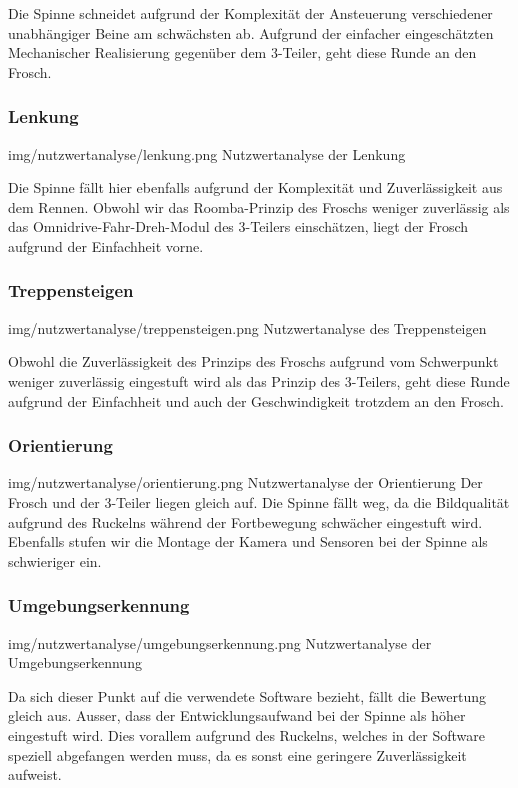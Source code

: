 Die Spinne schneidet aufgrund der Komplexität der Ansteuerung verschiedener unabhängiger Beine am schwächsten ab. Aufgrund der einfacher eingeschätzten Mechanischer Realisierung gegenüber dem 3-Teiler, geht diese Runde an den Frosch.
   
\subsubsection{Lenkung}
\image
   {img/nutzwertanalyse/lenkung.png}
   {Nutzwertanalyse der Lenkung}
   
Die Spinne fällt hier ebenfalls aufgrund der Komplexität und Zuverlässigkeit aus dem Rennen. Obwohl wir das Roomba-Prinzip des Froschs weniger zuverlässig als das Omnidrive-Fahr-Dreh-Modul des 3-Teilers einschätzen, liegt der Frosch aufgrund der Einfachheit vorne.
   
\subsubsection{Treppensteigen}
\image
   {img/nutzwertanalyse/treppensteigen.png}
   {Nutzwertanalyse des Treppensteigen}
   
Obwohl die Zuverlässigkeit des Prinzips des Froschs aufgrund vom Schwerpunkt weniger zuverlässig eingestuft wird als das Prinzip des 3-Teilers, geht diese Runde aufgrund der Einfachheit und auch der Geschwindigkeit trotzdem an den Frosch.
   
\subsubsection{Orientierung}
\image
   {img/nutzwertanalyse/orientierung.png}
   {Nutzwertanalyse der Orientierung}
   Der Frosch und der 3-Teiler liegen gleich auf. Die Spinne fällt weg, da die Bildqualität aufgrund des Ruckelns während der Fortbewegung schwächer eingestuft wird. Ebenfalls stufen wir die Montage der Kamera und Sensoren bei der Spinne als schwieriger ein.

\subsubsection{Umgebungserkennung}
\image
   {img/nutzwertanalyse/umgebungserkennung.png}
   {Nutzwertanalyse der Umgebungserkennung}
   
Da sich dieser Punkt auf die verwendete Software bezieht, fällt die Bewertung gleich aus. Ausser, dass der Entwicklungsaufwand bei der Spinne als höher eingestuft wird. Dies vorallem aufgrund des Ruckelns, welches in der Software speziell abgefangen werden muss, da es sonst eine geringere Zuverlässigkeit aufweist. 
   
